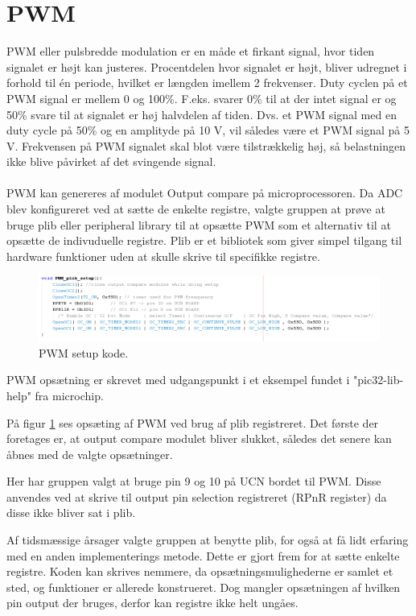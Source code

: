 \section{PWM}
PWM eller pulsbredde modulation er en måde et firkant signal, hvor tiden signalet er højt kan justeres. Procentdelen hvor signalet er højt, bliver udregnet i forhold til én periode, hvilket er længden imellem 2 frekvenser. Duty cyclen på et PWM signal er mellem 0 og 100\%. F.eks. svarer 0\% til at der intet signal er og 50\% svare til at signalet er høj halvdelen af tiden. Dvs. et PWM signal med en duty cycle på 50\% og en amplityde på 10 V, vil således være et PWM signal på 5 V. Frekvensen på PWM signalet skal blot være tilstrækkelig høj, så belastningen ikke blive påvirket af det svingende signal. 
\\
\\
PWM kan genereres af modulet Output compare på microprocessoren. Da ADC blev konfigureret ved at sætte de enkelte registre, valgte gruppen at prøve at bruge plib eller peripheral library til at opsætte PWM som et alternativ til at opsætte de indivuduelle registre. Plib er et bibliotek som giver simpel tilgang til hardware funktioner uden at skulle skrive til specifikke registre.

\begin{figure}[h!]
  \centering
  \includegraphics[width=1.0\textwidth]{figures/PWM_setup.png}
  \caption{PWM setup kode.}
  \label{PWM_setup}
\end{figure} 

PWM opsætning er skrevet med udgangspunkt i et eksempel fundet i "pic32-lib-help" fra microchip.  

På figur \ref{PWM_setup} ses opsæting af PWM ved brug af plib registreret. Det første der foretages er, at output compare modulet bliver slukket, således det senere kan åbnes med de valgte opsætninger. 

Her har gruppen valgt at bruge pin 9 og 10 på UCN bordet til PWM. Disse anvendes ved at skrive til output pin selection registreret (RPnR register) da disse ikke bliver sat i plib. 

Af tidsmæssige årsager valgte gruppen at benytte plib, for også at få lidt erfaring med en anden implementerings metode. Dette er gjort frem for at sætte enkelte registre. Koden kan skrives nemmere, da opsætningsmulighederne er samlet et sted, og funktioner er allerede konstrueret. Dog mangler opsætningen af hvilken pin output der bruges, derfor kan registre ikke helt ungåes.

